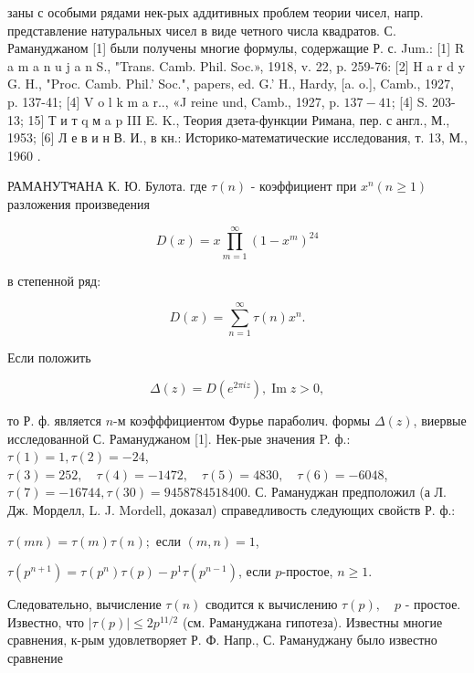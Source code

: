 \documentclass[10pt]{article}
\begin{document}
заны с особыми рядами нек-рых аддитивных проблем теории чисел, напр. представление натуральных чисел в виде четного числа квадратов. С. Рамануджаном [1] были получены многие формулы, содержащие Р. с. Jum.: [1] R a m a n u j a n S., "Trans. Camb. Phil. Soc.», 1918, v. 22, p. 259-76: [2] H a r d y G. H., "Proc. Camb. Phil.' Soc.", papers, ed. G.' H., Hardy, [a. o.], Camb., 1927, p. 137-41; [4] $\mathrm{V}$ o l k m a r.., «J reine und, Camb., 1927, p. $137-41$; [4] S. 203-13; 15] Т и т q м a p III E. K., Теория дзета-функции Римана, пер. с англ., М., 1953; [6] Л е в и н В. И., в кн.: Историко-математические исследования, т. 13, М., 1960 .



РАМАНУТभАНА К. Ю. Булота. где $\tau(n)$ - коэффициент при $x^{n}(n \geqslant 1)$ разложения произведения



\[

D(x)=x \prod_{m=1}^{\infty}\left(1-x^{m}\right)^{24}

\]



в степенной ряд:



\[

D(x)=\sum_{n=1}^{\infty} \tau(n) x^{n} .

\]



Если положить



\[

\Delta(z)=D\left(e^{2 \pi i z}\right), \operatorname{Im} z>0,

\]



то Р. ф. является $n$-м коэфффициентом Фурье параболич. формы $\Delta(z)$, виервые исследованной С. Рамануджаном [1]. Нек-рые значения P. ф.: $\tau(1)=1, \tau(2)=-24$, $\tau(3)=252, \quad \tau(4)=-1472, \quad \tau(5)=4830, \quad \tau(6)=-6048$, $\tau(7)=-16744, \tau(30)=9458784518400$. С. Рамануджан предположил (а Л. Дж. Морделл, L. J. Mordell, доказал) справедливость следующих свойств Р. ф.:



$\tau(m n)=\tau(m) \tau(n) ;$ если $(m, n)=1$,



$\tau\left(p^{n+1}\right)=\tau\left(p^{n}\right) \tau(p)-p^{1} \tau\left(p^{n-1}\right)$, если $p$-простое, $n \geqslant 1$.



Следовательно, вычисление $\tau(n)$ сводится к вычислению $\tau(p), \quad p$ - простое. Известно, что $|\tau(p)| \leqslant 2 p^{11 / 2}$ (см. Рамануджана гипотеза). Известны многие сравнения, к-рым удовлетворяет Р. Ф. Напр., С. Рамануджану было известно сравнение
\end{document}
